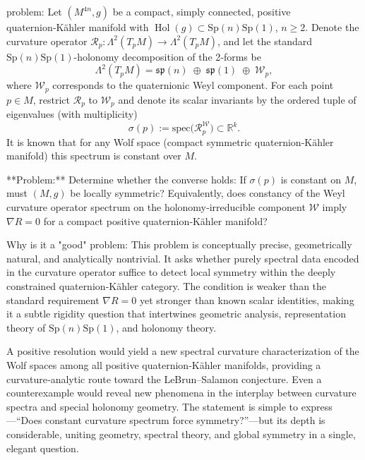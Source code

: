 problem:  
Let \((M^{4n}, g)\) be a compact, simply connected, positive quaternion‑Kähler manifold with \(\operatorname{Hol}(g)\subset \mathrm{Sp}(n)\mathrm{Sp}(1)\), \(n\ge 2\).  
Denote the curvature operator \(\mathcal R_p:\Lambda^2(T_pM)\to \Lambda^2(T_pM)\), and let the standard \(\mathrm{Sp}(n)\mathrm{Sp}(1)\)-holonomy decomposition of the 2‑forms be  
\[
\Lambda^2(T_pM)= \mathfrak{sp}(n)\;\oplus\; \mathfrak{sp}(1)\;\oplus\;\mathcal W_p,
\]
where \(\mathcal W_p\) corresponds to the quaternionic Weyl component.  
For each point \(p\in M\), restrict \(\mathcal R_p\) to \(\mathcal W_p\) and denote its scalar invariants by the ordered tuple of eigenvalues (with multiplicity)
\[
\sigma(p):=\text{spec}\big(\mathcal R^{\mathcal W}_p\big)\subset \mathbb{R}^k.
\]
It is known that for any Wolf space (compact symmetric quaternion‑Kähler manifold) this spectrum is constant over \(M\).  

**Problem:**  
Determine whether the converse holds: If \(\sigma(p)\) is constant on \(M\), must \((M,g)\) be locally symmetric?  
Equivalently, does constancy of the Weyl curvature operator spectrum on the holonomy‑irreducible component \(\mathcal W\) imply \(\nabla R=0\) for a compact positive quaternion‑Kähler manifold?  

Why is it a "good" problem:  
This problem is conceptually precise, geometrically natural, and analytically nontrivial. It asks whether purely spectral data encoded in the curvature operator suffice to detect local symmetry within the deeply constrained quaternion‑Kähler category. The condition is weaker than the standard requirement \(\nabla R=0\) yet stronger than known scalar identities, making it a subtle rigidity question that intertwines geometric analysis, representation theory of \(\mathrm{Sp}(n)\mathrm{Sp}(1)\), and holonomy theory.

A positive resolution would yield a new spectral curvature characterization of the Wolf spaces among all positive quaternion‑Kähler manifolds, providing a curvature‑analytic route toward the LeBrun–Salamon conjecture. Even a counterexample would reveal new phenomena in the interplay between curvature spectra and special holonomy geometry. The statement is simple to express—“Does constant curvature spectrum force symmetry?”—but its depth is considerable, uniting geometry, spectral theory, and global symmetry in a single, elegant question.